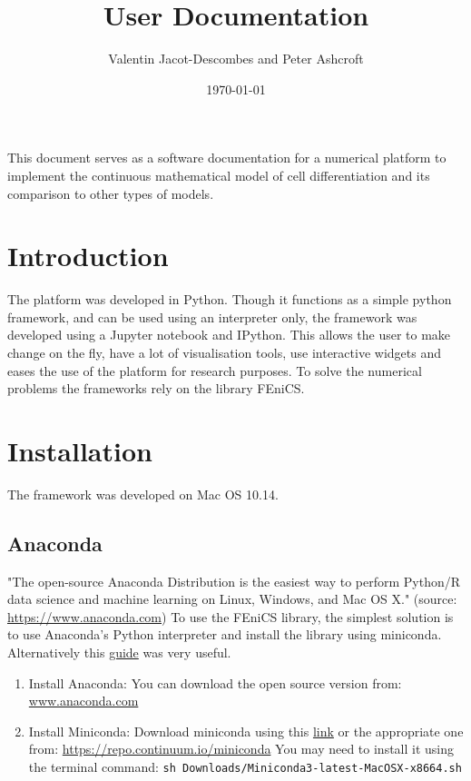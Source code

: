 \documentclass[11pt, oneside]{article}   	%
\title{User Documentation}
\author{Valentin Jacot-Descombes and Peter Ashcroft}
\date{\today}							%
\begin{document}
\maketitle
This document serves as a software documentation for a numerical platform to implement the continuous mathematical model of cell differentiation and its comparison to other types of models.   

\tableofcontents
\newpage

\section{Introduction}
The platform was developed in Python. Though it functions as a simple python framework, and can be used using an interpreter only, the framework was developed using a Jupyter notebook and IPython. This allows the user to make change on the fly, have a lot of visualisation tools, use interactive widgets and eases the use of the platform for research purposes. To solve the numerical problems the frameworks rely on the library FEniCS. \newline

\section{Installation}
The framework was developed on Mac OS 10.14.
\subsection{Anaconda}
"The open-source Anaconda Distribution is the easiest way to perform Python/R data science and machine learning on Linux, Windows, and Mac OS X." (source: \url{https://www.anaconda.com})\newline \newline
To use the FEniCS library, the simplest solution is to use Anaconda's Python interpreter and install the library using miniconda. 
\newline
Alternatively this \href{https://klasmodin.wordpress.com/2017/09/28/fenics-using-conda/}{guide} was very useful.
\begin{enumerate}
\item{Install Anaconda:}\newline
You can download the open source version from: \url{www.anaconda.com}
\item{Install Miniconda:}\newline
Download miniconda using this \href{https://repo.continuum.io/miniconda/Miniconda3-latest-MacOSX-x86\_64.sh}{link} or the appropriate one from: \url{https://repo.continuum.io/miniconda}\newline
You may need to install it using the terminal command: \texttt{sh Downloads/Miniconda3-latest-MacOSX-x8664.sh}
\end{enumerate}
\end{document}
